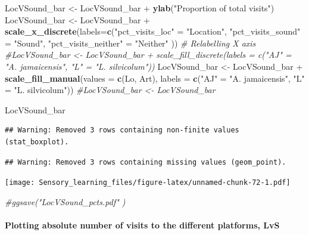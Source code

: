 \documentclass[]{article}
\newenvironment{Shaded}{\begin{snugshade}}{\end{snugshade}}
\newcommand{\KeywordTok}[1]{\textcolor[rgb]{0.13,0.29,0.53}{\textbf{{#1}}}}
\newcommand{\DataTypeTok}[1]{\textcolor[rgb]{0.13,0.29,0.53}{{#1}}}
\newcommand{\StringTok}[1]{\textcolor[rgb]{0.31,0.60,0.02}{{#1}}}
\newcommand{\CommentTok}[1]{\textcolor[rgb]{0.56,0.35,0.01}{\textit{{#1}}}}
\newcommand{\NormalTok}[1]{{#1}}
\let\oldparagraph\paragraph
\renewcommand{\paragraph}[1]{\oldparagraph{#1}\mbox{}}
\begin{document}
\begin{Shaded}
\begin{Highlighting}[]
\NormalTok{LocVSound_bar <-}\StringTok{ }\NormalTok{LocVSound_bar +}\StringTok{ }\KeywordTok{ylab}\NormalTok{(}\StringTok{"Proportion of total visits"}\NormalTok{)}
\NormalTok{LocVSound_bar <-}\StringTok{ }\NormalTok{LocVSound_bar +}\StringTok{ }\KeywordTok{scale_x_discrete}\NormalTok{(}\DataTypeTok{labels=}\KeywordTok{c}\NormalTok{(}\StringTok{"pct_visits_loc"} \NormalTok{=}\StringTok{ "Location"}\NormalTok{, }\StringTok{"pct_visits_sound"} \NormalTok{=}\StringTok{ "Sound"}\NormalTok{,}
                              \StringTok{"pct_visits_neither"} \NormalTok{=}\StringTok{ "Neither"} \NormalTok{))  }\CommentTok{# Relabelling X axis}
\CommentTok{#LocVSound_bar <- LocVSound_bar + scale_fill_discrete(labels = c("AJ" = "A. jamaicensis", "L" = "L. silvicolum"))}
\NormalTok{LocVSound_bar <-}\StringTok{ }\NormalTok{LocVSound_bar +}\StringTok{ }\KeywordTok{scale_fill_manual}\NormalTok{(}\DataTypeTok{values =} \KeywordTok{c}\NormalTok{(Lo, Art), }\DataTypeTok{labels =} \KeywordTok{c}\NormalTok{(}\StringTok{"AJ"} \NormalTok{=}\StringTok{ "A. jamaicensis"}\NormalTok{, }\StringTok{"L"} \NormalTok{=}\StringTok{ "L. silvicolum"}\NormalTok{))}
\CommentTok{#LocVSound_bar <- LocVSound_bar }

\NormalTok{LocVSound_bar}
\end{Highlighting}
\end{Shaded}

\begin{verbatim}
## Warning: Removed 3 rows containing non-finite values (stat_boxplot).
\end{verbatim}

\begin{verbatim}
## Warning: Removed 3 rows containing missing values (geom_point).
\end{verbatim}

\texttt{[image: Sensory\_learning\_files/figure-latex/unnamed-chunk-72-1.pdf]}

\begin{Shaded}
\begin{Highlighting}[]
\CommentTok{#ggsave("LocVSound_pcts.pdf"  )}
\end{Highlighting}
\end{Shaded}

\paragraph{Plotting absolute number of visits to the different
platforms,
LvS}\label{plotting-absolute-number-of-visits-to-the-different-platforms-lvs}
\end{document}
